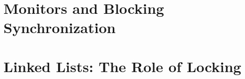 \documentclass[letter,12pt]{report}
\begin{document}
\chapter{Monitors and Blocking Synchronization}



\chapter{Linked Lists: The Role of Locking}
%
%
\end{document}
